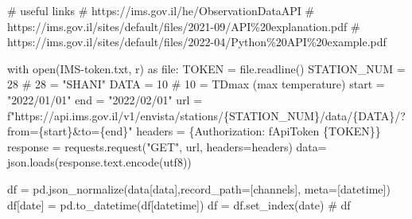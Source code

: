 \documentclass[
  letterpaper,
  DIV=11,
  numbers=noendperiod,
  oneside]{scrreprt}
\newenvironment{Shaded}{\begin{snugshade}}{\end{snugshade}}
\newcommand{\BuiltInTok}[1]{\textcolor[rgb]{0.00,0.23,0.31}{#1}}
\newcommand{\CommentTok}[1]{\textcolor[rgb]{0.37,0.37,0.37}{#1}}
\newcommand{\ControlFlowTok}[1]{\textcolor[rgb]{0.00,0.23,0.31}{#1}}
\newcommand{\DecValTok}[1]{\textcolor[rgb]{0.68,0.00,0.00}{#1}}
\newcommand{\ImportTok}[1]{\textcolor[rgb]{0.00,0.46,0.62}{#1}}
\newcommand{\NormalTok}[1]{\textcolor[rgb]{0.00,0.23,0.31}{#1}}
\newcommand{\OperatorTok}[1]{\textcolor[rgb]{0.37,0.37,0.37}{#1}}
\newcommand{\SpecialCharTok}[1]{\textcolor[rgb]{0.37,0.37,0.37}{#1}}
\newcommand{\SpecialStringTok}[1]{\textcolor[rgb]{0.13,0.47,0.30}{#1}}
\newcommand{\StringTok}[1]{\textcolor[rgb]{0.13,0.47,0.30}{#1}}
\begin{document}
\begin{Shaded}
\begin{Highlighting}[]
\CommentTok{\# useful links}
\CommentTok{\# https://ims.gov.il/he/ObservationDataAPI}
\CommentTok{\# https://ims.gov.il/sites/default/files/2021{-}09/API\%20explanation.pdf}
\CommentTok{\# https://ims.gov.il/sites/default/files/2022{-}04/Python\%20API\%20example.pdf}

\ControlFlowTok{with} \BuiltInTok{open}\NormalTok{(}\StringTok{\textquotesingle{}IMS{-}token.txt\textquotesingle{}}\NormalTok{, }\StringTok{\textquotesingle{}r\textquotesingle{}}\NormalTok{) }\ImportTok{as} \BuiltInTok{file}\NormalTok{:}
\NormalTok{    TOKEN }\OperatorTok{=} \BuiltInTok{file}\NormalTok{.readline()}
\NormalTok{STATION\_NUM }\OperatorTok{=} \DecValTok{28}  \CommentTok{\# 28 = "SHANI"}
\NormalTok{DATA }\OperatorTok{=} \DecValTok{10}  \CommentTok{\# 10 = TDmax (max temperature)}
\NormalTok{start }\OperatorTok{=} \StringTok{"2022/01/01"}
\NormalTok{end }\OperatorTok{=} \StringTok{"2022/02/01"}
\NormalTok{url }\OperatorTok{=} \SpecialStringTok{f"https://api.ims.gov.il/v1/envista/stations/}\SpecialCharTok{\{}\NormalTok{STATION\_NUM}\SpecialCharTok{\}}\SpecialStringTok{/data/}\SpecialCharTok{\{}\NormalTok{DATA}\SpecialCharTok{\}}\SpecialStringTok{/?from=}\SpecialCharTok{\{}\NormalTok{start}\SpecialCharTok{\}}\SpecialStringTok{\&to=}\SpecialCharTok{\{}\NormalTok{end}\SpecialCharTok{\}}\SpecialStringTok{"}
\NormalTok{headers }\OperatorTok{=}\NormalTok{ \{}\StringTok{\textquotesingle{}Authorization\textquotesingle{}}\NormalTok{: }\SpecialStringTok{f\textquotesingle{}ApiToken }\SpecialCharTok{\{}\NormalTok{TOKEN}\SpecialCharTok{\}}\SpecialStringTok{\textquotesingle{}}\NormalTok{\}}
\NormalTok{response }\OperatorTok{=}\NormalTok{ requests.request(}\StringTok{"GET"}\NormalTok{, url, headers}\OperatorTok{=}\NormalTok{headers)}
\NormalTok{data}\OperatorTok{=}\NormalTok{ json.loads(response.text.encode(}\StringTok{\textquotesingle{}utf8\textquotesingle{}}\NormalTok{))}
\end{Highlighting}
\end{Shaded}

\begin{Shaded}
\begin{Highlighting}[]
\NormalTok{df }\OperatorTok{=}\NormalTok{ pd.json\_normalize(data[}\StringTok{\textquotesingle{}data\textquotesingle{}}\NormalTok{],record\_path}\OperatorTok{=}\NormalTok{[}\StringTok{\textquotesingle{}channels\textquotesingle{}}\NormalTok{], meta}\OperatorTok{=}\NormalTok{[}\StringTok{\textquotesingle{}datetime\textquotesingle{}}\NormalTok{])}
\NormalTok{df[}\StringTok{\textquotesingle{}date\textquotesingle{}}\NormalTok{] }\OperatorTok{=}\NormalTok{ pd.to\_datetime(df[}\StringTok{\textquotesingle{}datetime\textquotesingle{}}\NormalTok{])}
\NormalTok{df }\OperatorTok{=}\NormalTok{ df.set\_index(}\StringTok{\textquotesingle{}date\textquotesingle{}}\NormalTok{)}
\CommentTok{\# df}
\end{Highlighting}
\end{Shaded}
\end{document}
